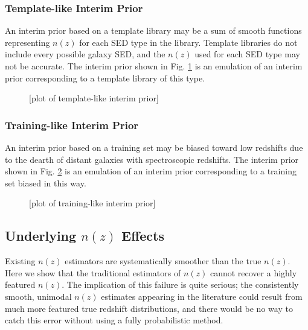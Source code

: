 \documentclass[iop]{emulateapj}
\begin{document}
\subsubsection{Template-like Interim Prior}
\label{sec:tempintpr}

An interim prior based on a template library may be a sum of smooth functions 
representing $n(z)$ for each SED type in the library.  Template libraries do 
not include every possible galaxy SED, and the $n(z)$ used for each SED type 
may not be accurate.  The interim prior shown in Fig. \ref{fig:tempintpr} is an 
emulation of an interim prior corresponding to a template library of this type.

\begin{figure}
	\begin{center}
		\caption{[plot of template-like interim prior]}
		\label{fig:tempintpr}
	\end{center}
\end{figure}

\subsubsection{Training-like Interim Prior}
\label{sec:trainintpr}

An interim prior based on a training set may be biased toward low redshifts due 
to the dearth of distant galaxies with spectroscopic redshifts.  The interim 
prior shown in Fig. \ref{fig:trainintpr} is an emulation of an interim prior 
corresponding to a training set biased in this way.

\begin{figure}
	\begin{center}
		\caption{[plot of training-like interim prior]}
		\label{fig:trainintpr}
	\end{center}
\end{figure}

\subsection{Underlying $n(z)$ Effects}
\label{sec:truth}

Existing $n(z)$ estimators are systematically smoother than the true $n(z)$.  
Here we show that the traditional estimators of $n(z)$ cannot recover a highly 
featured $n(z)$.  The implication of this failure is quite serious; the 
consistently smooth, unimodal $n(z)$ estimates appearing in the literature 
could result from much more featured true redshift distributions, and there 
would be no way to catch this error without using a fully probabilistic method.
\end{document}
